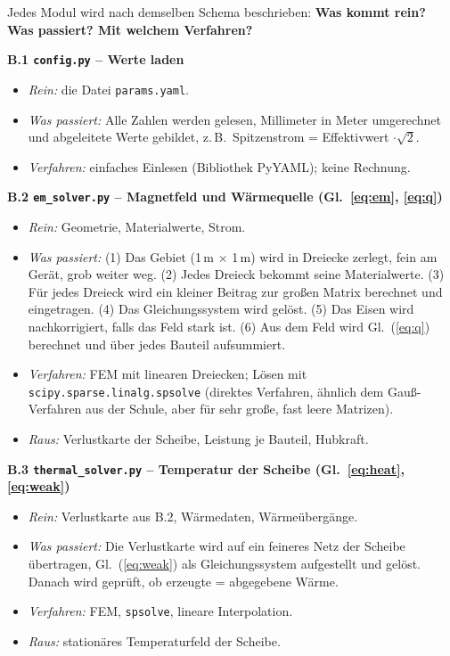 \documentclass[a4paper, 10pt, conference]{ieeeconf}
\newcommand{\anh}[1]{\par\medskip\noindent\textbf{#1}\quad}
\begin{document}
\begingroup\raggedright
Jedes Modul wird nach demselben Schema beschrieben: \textbf{Was kommt rein?
Was passiert? Mit welchem Verfahren?}

\anh{B.1 \texttt{config.py} -- Werte laden}
\begin{itemize}[leftmargin=*, nosep]
  \item \textit{Rein:} die Datei \texttt{params.yaml}.
  \item \textit{Was passiert:} Alle Zahlen werden gelesen, Millimeter in
        Meter umgerechnet und abgeleitete Werte gebildet, z.\,B.\
        Spitzenstrom = Effektivwert $\cdot\sqrt2$.
  \item \textit{Verfahren:} einfaches Einlesen (Bibliothek PyYAML); keine
        Rechnung.
\end{itemize}

\anh{B.2 \texttt{em\_solver.py} -- Magnetfeld und Wärmequelle (Gl.~\ref{eq:em}, \ref{eq:q})}
\begin{itemize}[leftmargin=*, nosep]
  \item \textit{Rein:} Geometrie, Materialwerte, Strom.
  \item \textit{Was passiert:} (1) Das Gebiet (1\,m $\times$ 1\,m) wird in
        Dreiecke zerlegt, fein am Gerät, grob weiter weg. (2) Jedes Dreieck
        bekommt seine Materialwerte. (3) Für jedes Dreieck wird ein kleiner
        Beitrag zur großen Matrix berechnet und eingetragen. (4) Das
        Gleichungssystem wird gelöst. (5) Das Eisen wird nachkorrigiert,
        falls das Feld stark ist. (6) Aus dem Feld wird Gl.~(\ref{eq:q})
        berechnet und über jedes Bauteil aufsummiert.
  \item \textit{Verfahren:} FEM mit linearen Dreiecken; Lösen mit
        \texttt{scipy.sparse.linalg.spsolve} (direktes Verfahren, ähnlich dem
        Gauß-Verfahren aus der Schule, aber für sehr große, fast leere
        Matrizen).
  \item \textit{Raus:} Verlustkarte der Scheibe, Leistung je Bauteil,
        Hubkraft.
\end{itemize}

\anh{B.3 \texttt{thermal\_solver.py} -- Temperatur der Scheibe (Gl.~\ref{eq:heat}, \ref{eq:weak})}
\begin{itemize}[leftmargin=*, nosep]
  \item \textit{Rein:} Verlustkarte aus B.2, Wärmedaten, Wärmeübergänge.
  \item \textit{Was passiert:} Die Verlustkarte wird auf ein feineres Netz
        der Scheibe übertragen, Gl.~(\ref{eq:weak}) als Gleichungssystem
        aufgestellt und gelöst. Danach wird geprüft, ob erzeugte = abgegebene
        Wärme.
  \item \textit{Verfahren:} FEM, \texttt{spsolve}, lineare Interpolation.
  \item \textit{Raus:} stationäres Temperaturfeld der Scheibe.
\end{itemize}
\end{document}
